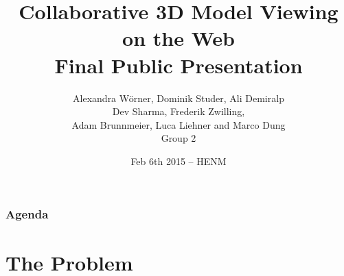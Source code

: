 

\title[Collaborative 3D Model Viewing on the Web]{Collaborative 3D Model Viewing on the Web\\  Final Public Presentation}
\author[Group 2]{%
  Alexandra Wörner, Dominik Studer, Ali Demiralp\\ Dev Sharma, Frederik Zwilling, \\
  Adam Brunnmeier, Luca Liehner and Marco Dung\\
  \bigskip
  {\scriptsize Group 2}
}

\date[Feb 6th 2015 @ HENM 2015]{Feb 6th 2015 -- HENM}



\frame[plain]{\titlepage}
\addtocounter{framenumber}{-1}

\begin{frame}
  \frametitle{Agenda}
  \tableofcontents[hideallsubsections]
\end{frame}

\section{The Problem}

